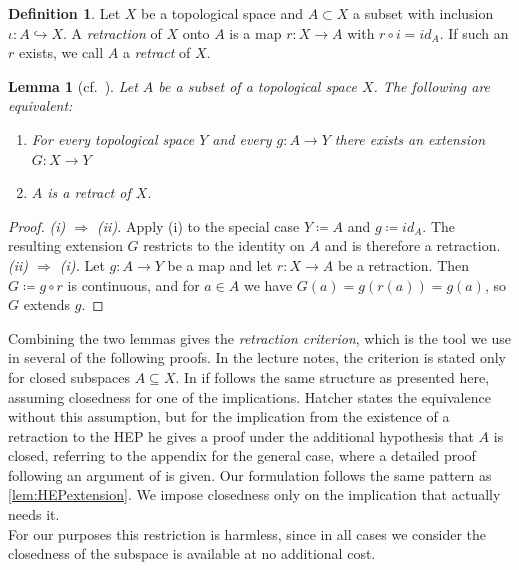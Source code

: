 \documentclass[11pt, a4paper, english]{article}
\theoremstyle{plain}
\newtheorem{lemma}[theorem]{Lemma}
\theoremstyle{definition}
\newtheorem{definition}[theorem]{Definition}
\theoremstyle{remark}
\numberwithin{equation}{section}
\numberwithin{theorem}{section}
\begin{document}
\begin{definition} \label{def:retraction}
    Let $X$ be a topological space and $A \subset X$ a subset with inclusion $ \iota : A \hookrightarrow X $. A \emph{retraction} of $X$ onto $A$ is a map $r \colon X \to A$ with $r \circ i = id_A $. If such an $r$ exists, we call $A$ a \emph{retract} of $X$.
\end{definition}

\begin{lemma} [cf.\ {\cite[Hilfssatz, page 39]{WAL}}] \label{lem:retract}
    Let $A$ be a subset of a topological space $X$. The following are equivalent:
    \begin{enumerate}
        \renewcommand{\labelenumi}{(\roman{enumi})}
        \item For every topological space $Y$ and every $g \colon A \to Y$ there exists an extension $G \colon X \to Y$ 
        \item $A$ is a retract of $X$.
    \end{enumerate}
\end{lemma}

\begin{proof}
    \emph{(i) $\Rightarrow$ (ii).}
    Apply (i) to the special case $Y \coloneqq A$ and $g \coloneqq id_A$. The resulting extension $G$ restricts to the
    identity on $A$ and is therefore a retraction. \\
    \emph{(ii) $\Rightarrow$ (i).} 
    Let $g \colon A \to Y$ be a map and let $r \colon X \to A$ be a retraction. Then $G \coloneqq g \circ r$ is continuous, and for $a \in A$ we have $G(a) = g(r(a)) = g(a)$, so $G$ extends $g$. 
\end{proof}
Combining the two lemmas gives the \emph{retraction criterion}, which is the tool we use in several of the following proofs. In the lecture notes, the criterion is stated only for closed subspaces $A \subseteq X$. In \cite{Tammo} if follows the same structure as presented here, assuming closedness for one of the implications. Hatcher \cite[Chapter 0]{HAT01} states the equivalence without this assumption, but for the implication from the existence of a retraction to the HEP he gives a proof under the additional hypothesis that $A$ is closed, referring to the appendix \cite[Appendix]{HAT01} for the general case, where a detailed proof following an argument of \cite{STM} is given. Our formulation follows the same pattern as \cref{lem:HEPextension}. We impose closedness only on the implication that actually needs it. \\
For our purposes this restriction is harmless, since in all cases we consider the closedness of the subspace is available at no additional cost.
\end{document}
